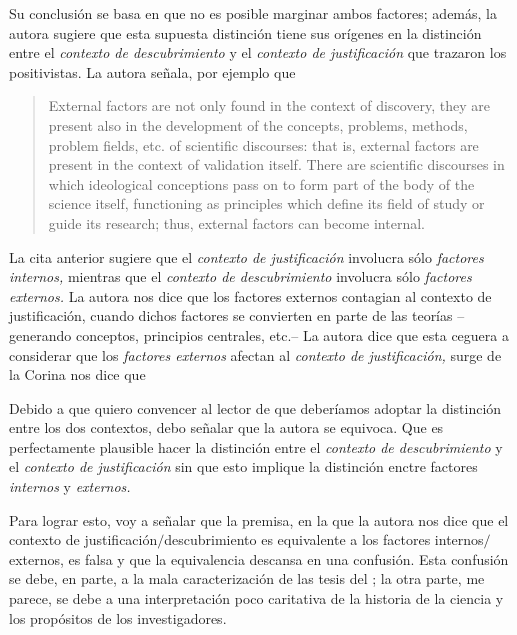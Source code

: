 Su conclusión se basa en que no es posible marginar ambos factores; además, la autora sugiere que esta supuesta distinción tiene sus orígenes en la distinción entre el \emph{contexto de descubrimiento} y el \emph{contexto de justificación} que trazaron los positivistas.
La autora señala, por ejemplo que

\begin{quote}
	External factors are not only found in the context of discovery, they are present also in the development of the concepts, problems, methods, problem fields, etc. of scientific discourses: that is, external factors are present in the context of validation itself.
	There are scientific discourses in which ideological conceptions pass on to form part of the body of the science itself, functioning as principles which define its field of study or guide its research; thus, external factors can become internal. \parencite[p. 85]{Yturbe1995}
\end{quote}

La cita anterior sugiere que el \emph{contexto de justificación} involucra sólo \emph{factores internos,} mientras que el \emph{contexto de descubrimiento} involucra sólo \emph{factores externos.}
La autora nos dice que los factores externos contagian al contexto de justificación, cuando dichos factores se convierten en parte de las teorías --generando conceptos, principios centrales, etc.--
La autora dice que esta ceguera a considerar que los \emph{factores externos} afectan al \emph{contexto de justificación,} surge de la 
Corina nos dice que  \parencite[p. 75]{Yturbe1995}

Debido a que quiero convencer al lector de que deberíamos adoptar la distinción entre los dos contextos, debo señalar que la autora se equivoca.
Que es perfectamente plausible hacer la distinción entre el \emph{contexto de descubrimiento} y el \emph{contexto de justificación} sin que esto implique la distinción enctre factores \emph{internos} y \emph{externos.}

Para lograr esto, voy a señalar que la premisa, en la que la autora nos dice que el contexto de justificación$/$descubrimiento es equivalente a los factores internos$/$externos, es falsa y que la equivalencia descansa en una confusión.
Esta confusión se debe, en parte, a la mala caracterización de las tesis del ; la otra parte, me parece, se debe a una interpretación poco caritativa de la historia de la ciencia y los propósitos de los investigadores.

